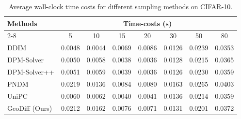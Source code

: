 

\begin{table}[htbp]
    \centering
    \caption{Average wall-clock time costs for different sampling methods on CIFAR-10.}
    \label{tab:cifar10_timing}
    \begin{tabular}{l|ccccccc}
    \toprule
    \multirow{2}{*}{Methods} & \multicolumn{7}{c}{Time-costs (s)} \\
    \cmidrule{2-8}
    & 5 & 10 & 15 & 20 & 30 & 50 & 80 \\
    \midrule
    DDIM & 0.0048 & 0.0044 & 0.0069 & 0.0086 & 0.0126 & 0.0239 & 0.0353 \\
    DPM-Solver & 0.0050 & 0.0058 & 0.0038 & 0.0036 & 0.0128 & 0.0215 & 0.0365 \\
    DPM-Solver++ & 0.0051 & 0.0059 & 0.0039 & 0.0036 & 0.0126 & 0.0230 & 0.0359 \\
    PNDM & 0.0219 & 0.0136 & 0.0084 & 0.0080 & 0.0163 & 0.0265 & 0.0403 \\
    UniPC & 0.0060 & 0.0062 & 0.0040 & 0.0041 & 0.0136 & 0.0214 & 0.0359 \\
    GeoDiff (Ours) & 0.0212 & 0.0162 & 0.0076 & 0.0071 & 0.0131 & 0.0201 & 0.0372 \\
    \bottomrule
    \end{tabular}
    \end{table}



